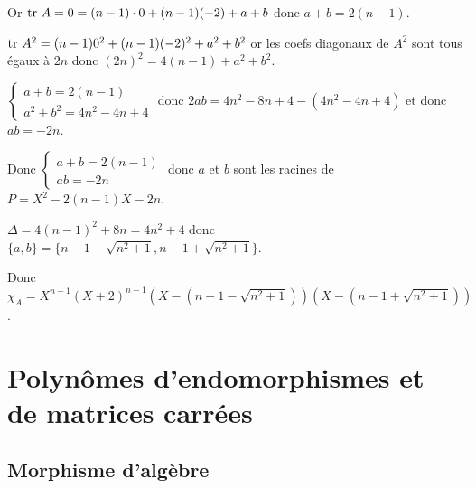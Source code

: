 \begin{exemple}
        Or $\operatorname{tr} \, A = 0 = (n - 1) \cdot 0 + (n - 1)(-2) + a + b$ donc $a + b = 2(n - 1)$.

        $\operatorname{tr} \, A^2 = (n - 1) 0^2 + (n - 1)(-2)^2 + a^2 + b^2$ 
        or les coefs diagonaux de $A^2$ sont tous égaux à $2n$ donc 
        $(2n)^2 = 4(n - 1) + a^2 + b^2$.

        $\begin{cases}
            a + b = 2(n - 1) \\
            a^2 + b^2 = 4n^2 - 4n + 4
        \end{cases}$ donc $2ab = 4n^2 - 8n + 4 - (4n^2 - 4n + 4)$ et 
        donc $ab = -2n$. 

        Donc $\begin{cases}
            a + b = 2(n - 1) \\
            ab = -2n
        \end{cases}$ donc $a$ et $b$ sont les racines de $P = X^2 - 2(n - 1)X - 2n$.

        $\Delta = 4(n - 1)^2 + 8 n = 4n^2 + 4$ donc 
        $\{a, b\} = \{n - 1 - \sqrt{n^2 + 1}, n - 1 + \sqrt{n^2 + 1}\}$.

        Donc $\chi_A = X^{n -1} (X + 2)^{n - 1} (X - (n - 1 - \sqrt{n^2 + 1}))(X - (n - 1 + \sqrt{n^2 + 1}))$.
\end{exemple}

\section{Polynômes d'endomorphismes et de matrices carrées}
\subsection{Morphisme d'algèbre }


